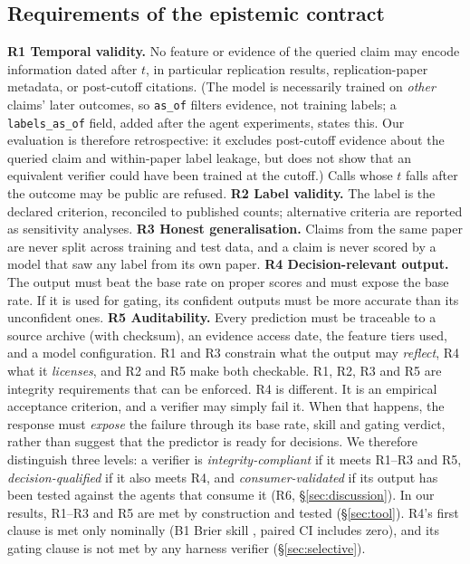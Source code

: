 \documentclass[conference]{IEEEtran}
\begin{document}
\subsection{Requirements of the epistemic contract}
\textbf{R1 Temporal validity.} No feature or evidence of the queried claim may encode information dated after $t$, in particular replication results, replication-paper metadata, or post-cutoff citations. (The model is necessarily trained on \emph{other} claims' later outcomes, so \texttt{as\_of} filters evidence, not training labels; a \texttt{labels\_as\_of} field, added after the agent experiments, states this. Our evaluation is therefore retrospective: it excludes post-cutoff evidence about the queried claim and within-paper label leakage, but does not show that an equivalent verifier could have been trained at the cutoff.) Calls whose $t$ falls after the outcome may be public are refused.
\textbf{R2 Label validity.} The label is the declared criterion, reconciled to published counts; alternative criteria are reported as sensitivity analyses.
\textbf{R3 Honest generalisation.} Claims from the same paper are never split across training and test data, and a claim is never scored by a model that saw any label from its own paper.
\textbf{R4 Decision-relevant output.} The output must beat the base rate on proper scores and must expose the base rate. If it is used for gating, its confident outputs must be more accurate than its unconfident ones.
\textbf{R5 Auditability.} Every prediction must be traceable to a source archive (with checksum), an evidence access date, the feature tiers used, and a model configuration.
R1 and R3 constrain what the output may \emph{reflect}, R4 what it \emph{licenses}, and R2 and R5 make both checkable. R1, R2, R3 and R5 are integrity requirements that can be enforced. R4 is different. It is an empirical acceptance criterion, and a verifier may simply fail it. When that happens, the response must \emph{expose} the failure through its base rate, skill and gating verdict, rather than suggest that the predictor is ready for decisions. We therefore distinguish three levels: a verifier is \emph{integrity-compliant} if it meets R1--R3 and R5, \emph{decision-qualified} if it also meets R4, and \emph{consumer-validated} if its output has been tested against the agents that consume it (R6, \S\ref{sec:discussion}). In our results, R1--R3 and R5 are met by construction and tested (\S\ref{sec:tool}). R4's first clause is met only nominally (B1 Brier skill \bssBone{}, paired CI includes zero), and its gating clause is not met by any harness verifier (\S\ref{sec:selective}).
\end{document}
